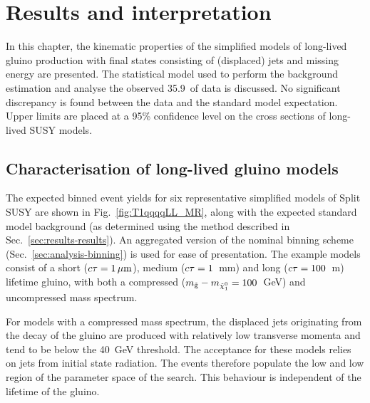 \chapter{Results and interpretation}
\label{chap:results}



In this chapter, the kinematic properties of the simplified models of 
long-lived gluino production with final states consisting of (displaced) jets 
and missing energy are presented. The statistical model used to perform the 
background estimation and analyse the observed 35.9~\ifb of data is discussed. 
No significant discrepancy is found between the data and the standard model 
expectation. Upper limits are placed at a 95\% confidence level on the cross 
sections of long-lived SUSY models. 


\section{Characterisation of long-lived gluino models}

The expected binned event yields for six representative simplified models of 
Split SUSY are shown in Fig.~\ref{fig:T1qqqqLL_MR}, along with the expected 
standard model background (as determined using the method described in 
Sec.~\ref{sec:results-results}). An aggregated version of the nominal binning 
scheme (Sec.~\ref{sec:analysis-binning}) is used for ease of presentation. The 
example models consist of a short ($c\tau=1\,{\mu}\text{m}$), medium ($c\tau=1$~mm) and 
long ($c\tau=100$~m) lifetime gluino, with both a compressed ($m_{\mathrm{\tilde{g}}} - m_{\tilde{\chi}_1^0} = 
100$~GeV) and uncompressed mass spectrum.

For models with a compressed mass spectrum, the displaced jets originating from 
the decay of the gluino are produced with relatively low transverse momenta and 
tend to be below the 40~GeV threshold. The acceptance for these models relies 
on jets from initial state radiation. The events therefore populate the low 
\njet and low \scalht region of the parameter space of the search. This 
behaviour is independent of the lifetime of the gluino.

